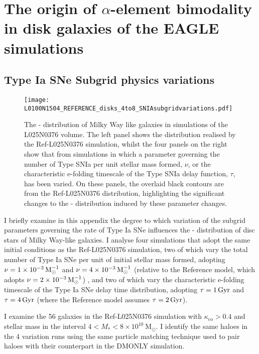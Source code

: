 \chapter{The origin of $\alpha$-element bimodality in disk galaxies of the EAGLE simulations}

\section{Type Ia SNe Subgrid physics variations}
\label{sec:subgrid}

\begin{figure*}
\texttt{[image: L0100N1504\_REFERENCE\_disks\_4to8\_SNIAsubgridvariations.pdf]}
\caption[The \afe{}-\feh{} distribution of Milky Way like galaxies in L025N0376 under variations of the SNe feedback sub-grid scheme]{\label{fig:subgrid} The \afe{}-\feh{} distribution of Milky Way like galaxies in simulations of the L025N0376 volume. The left panel shows the distribution realised by the Ref-L025N0376 simulation, whilst the four panels on the right show that from simulations in which a parameter governing the number of Type SNIa per unit stellar mass formed, $\nu$, or the characteristic e-folding timescale of the Type SNIa delay function, $\tau$, has been varied. On these panels, the overlaid black contours are from the Ref-L025N0376 distribution, highlighting the significant changes to the \afe{}-\feh{} distribution induced by these parameter changes.}
\end{figure*}

I briefly examine in this appendix the degree to which variation of the subgrid parameters governing the rate of Type Ia SNe influences the \afe{}-\feh{} distribution of disc stars of Milky Way-like galaxies. I analyse four simulations that adopt the same initial conditions as the Ref-L025N0376 simulation, two of which vary the total number of Type Ia SNe per unit of initial stellar mass formed, adopting $\nu = 1\times 10^{-3}\,{\rm M}_{\odot}^{-1}$ and $\nu = 4\times 10^{-3}\,{\rm M}_{\odot}^{-1}$ (relative to the Reference model, which adopts $\nu = 2\times 10^{-3}\,{\rm M}_{\odot}^{-1}$) , and two of which vary the characteristic e-folding timescale of the Type Ia SNe delay time distribution, adopting $\tau = 1\,{\rm Gyr}$ and $\tau = 4\,{\rm Gyr}$ (where the Reference model assumes $\tau = 2\,{\rm Gyr}$).

I examine the 56 galaxies in the Ref-L025N0376 simulation with $\kappa_\mathrm{co} > 0.4$ and stellar mass in the interval $4 < M_* < 8\times10^{10}\ \mathrm{M_{\odot}}$. I identify the same haloes in the 4 variation runs using the same particle matching technique \citep{2015MNRAS.453L..58S} used to pair haloes with their counterpart in the DMONLY simulation.


